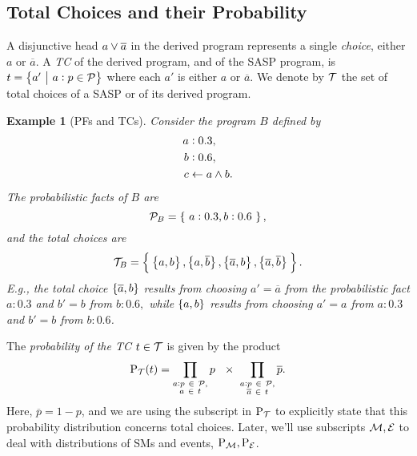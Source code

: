 \documentclass{tlp}
\newtheorem{example}{Example}
\newcommand{\eat}[1]{}
\newcommand{\at}[1]{\ensuremath{\!\del{#1}}}        %
\newcommand{\cla}[1]{\ensuremath{{\cal #1}}}        %
\newcommand{\clause}{\ensuremath{\leftarrow}}
\newcommand{\co}[1]{\ensuremath{\overline{#1}}}     %
\newcommand{\PROBFset}{\ensuremath{\cla{P}}}
\newcommand{\TCHOICEset}{\ensuremath{\cla{T}}}
\newcommand{\MODELset}{\ensuremath{\cla{M}}}
\newcommand{\EVENTSset}{\ensuremath{\cla{E}}}
\newcommand{\prfunc}{\ensuremath{\mathrm{P}}}
\newcommand{\prd}[1]{\ensuremath{\prfunc_{#1}}}
\newcommand{\prT}{\prd{\TCHOICEset}}
\newcommand{\prM}{\prd{\MODELset}}
\newcommand{\prE}{\prd{\EVENTSset}}
\newcommand{\given}{\ensuremath{~\middle|~}}
\newcommand{\probfact}[2]{\ensuremath{#1:#2}}
\newcommand{\franc}[1]{{\color{green!30!black}#1}}
\begin{document}
\subsection*{Total Choices and their Probability}

A disjunctive head \(a \disj \co{a}\) in the derived program
represents a single \textit{choice}, either \(a\) or \(\co{a}\).  A
\textit{\acl{TC}} of the derived program, and of the \ac{SASP}
program, is \(t = \set{a' \given \probfact{a}{p} \in \PROBFset}\)
where each \(a'\) is either \(a\) or \(\co{a}\).  We denote by
\(\TCHOICEset\) the set of total choices of a \ac{SASP} or of its
derived program.

\begin{example}[\Aclp{PF} and \aclp{TC}]
  \label{ex:total.choices}\em \eat{\franc{Example of total choices
      with more probabilistic facts.}}
    Consider the program $B$ defined by
    \begin{equation*}
        \begin{split}
            \probfact{a&}{0.3},\\
            \probfact{b&}{0.6},\\
            c & \clause a \wedge b.
        \end{split}\label{eq:total.choices}
    \end{equation*}
    The probabilistic facts of \(B\) are
       \[ \PROBFset_{B} = \set{~\probfact{a}{0.3}, \probfact{b}{0.6}~}, \]
    and the total choices are
       \[ \TCHOICEset_{B} = \set[2]{\:
            \set[1]{a, b},
            \set[1]{a, \co{b}},
            \set[1]{\co{a}, b},
            \set[1]{\co{a}, \co{b}}\: }. \]
    E.g., the total choice \(\set{\co{a}, b} \)
    results from choosing \(a' = \co{a}\) from the probabilistic fact
    $\probfact{a}{0.3}$ and $b' = b$ from \(\probfact{b}{0.6}, \)
    while \(\set{a, b} \) results from choosing \(a' = a\) from
    \(\probfact{a}{0.3}\) and \(b' = b\) from \(\probfact{b}{0.6}\).
\end{example}

The \emph{probability of the \acl{TC} \(t \in \TCHOICEset\)} is given
by the product
\begin{equation}
    \prT\at{t} =
    \prod_{\substack{
            \probfact{a}{p}~ \in ~\PROBFset,\\
            a~ \in~ t}} p\ \ \times\
    \prod_{\substack{
            \probfact{a}{p}~ \in ~\PROBFset,\\
            \co{a}~\in~ t}} \co{p}.
    \label{eq:prob.total.choice}
\end{equation}
Here, $\co{p} = 1 - p$, and we are using the subscript in \(\prT\) to
explicitly state that this probability distribution concerns total
choices.  Later, we'll use subscripts \(\MODELset, \EVENTSset\) to
deal with distributions of \aclp{SM} and events, \(\prM, \prE\).
\end{document}
